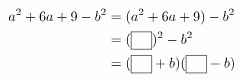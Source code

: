$\begin{aligned}a^2+6a+9-b^2&=(a^2+6a+9)-b^2\\ &=(\blank)^2-b^2\\ &=(\blank+b)(\blank-b)\end{aligned}$
